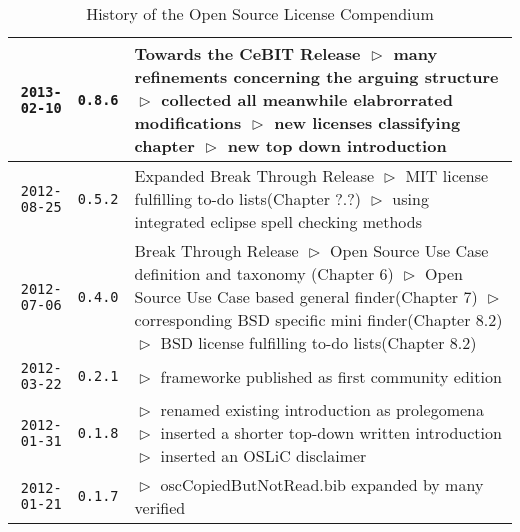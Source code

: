 \begin{table}
\footnotesize
\caption{History of the Open Source License Compendium}
\begin{center}
\begin{tabular}{|r|c|p{10cm}|}
\hline
\hline
    \texttt{2013-02-10}
  & \texttt{0.8.6} 
  & Towards the CeBIT Release\newline
    $\vartriangleright$ many refinements concerning the arguing structure\newline
    $\vartriangleright$ collected all meanwhile elabrorrated modifications\newline
    $\vartriangleright$ new licenses classifying chapter\newline   
    $\vartriangleright$ new top down introduction\newline
    \\
\hline
    \texttt{2012-08-25}
  & \texttt{0.5.2} 
  & Expanded Break Through Release\newline
    $\vartriangleright$ MIT license fulfilling to-do lists(Chapter ?.?)\newline
    $\vartriangleright$ using integrated eclipse spell checking methods\newline
    \\
\hline
    \texttt{2012-07-06}
  & \texttt{0.4.0} 
  & Break Through Release\newline
    $\vartriangleright$ Open Source Use Case definition and taxonomy
    (Chapter 6)\newline 
    $\vartriangleright$ Open Source Use Case based general finder(Chapter
    7)\newline 
    $\vartriangleright$ corresponding BSD specific mini finder(Chapter
    8.2)\newline 
    $\vartriangleright$ BSD license fulfilling to-do lists(Chapter 8.2)\\
\hline
    \texttt{2012-03-22}
  & \texttt{0.2.1} 
  & $\vartriangleright$ frameworke published as first community edition\\
\hline
    \texttt{2012-01-31}
  & \texttt{0.1.8} 
  & $\vartriangleright$ renamed existing introduction as prolegomena\newline
    $\vartriangleright$ inserted a shorter top-down written introduction\newline
    $\vartriangleright$ inserted an OSLiC disclaimer\\
\hline
    \texttt{2012-01-21}
  & \texttt{0.1.7} 
  & $\vartriangleright$ oscCopiedButNotRead.bib expanded by many verified

\end{tabular}
\end{center}
\end{table}
